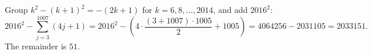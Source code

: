 Group $k^2-(k+1)^2=-(2k+1)$ for $k=6,8,\dots,2014$, and add $2016^2$:
\[2016^2-\sum_{j=3}^{1007}(4j+1)=2016^2-\left(4\cdot\dfrac{(3+1007)\cdot1005}{2}+1005\right)=4064256-2031105=2033151.\]
The remainder is $\boxed{51}$.
